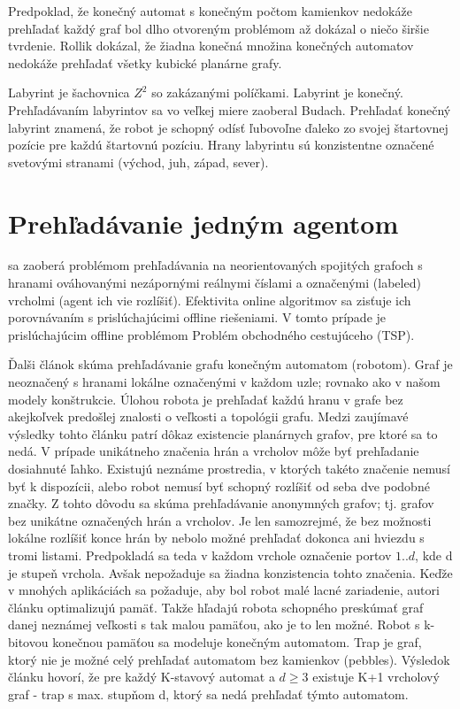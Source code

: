 Predpoklad, že konečný automat s konečným počtom 
kamienkov nedokáže prehľadať každý graf bol dlho otvoreným problémom až
\cite{ROLL} dokázal o niečo širšie tvrdenie. Rollik \cite{ROLL} dokázal, 
že žiadna konečná množina konečných automatov nedokáže prehľadať všetky 
kubické planárne grafy.

Labyrint je šachovnica $Z^2$ so zakázanými políčkami. 
Labyrint je konečný. Prehľadávaním labyrintov sa vo veľkej miere zaoberal 
Budach.
Prehľadať konečný labyrint znamená, že robot je schopný odísť ľubovoľne 
ďaleko zo svojej štartovnej pozície pre každú štartovnú pozíciu. 
Hrany labyrintu sú konzistentne označené svetovými stranami (východ, juh, 
západ, sever).

\section{Prehľadávanie jedným agentom}
\cite{OGE} sa zaoberá problémom prehľadávania na neorientovaných 
spojitých grafoch s hranami ováhovanými nezápornými reálnymi číslami a 
označenými (labeled) vrcholmi (agent ich vie rozlíšiť).
Efektivita online algoritmov sa zisťuje ich porovnávaním s  prislúchajúcimi 
offline riešeniami. V tomto prípade je prislúchajúcim offline problémom
Problém obchodného cestujúceho (TSP).

Ďalši článok \cite{GEFA}
skúma prehľadávanie grafu konečným automatom (robotom). 
Graf je neoznačený s hranami lokálne označenými v každom uzle; rovnako ako v
našom modely konštrukcie.
Úlohou robota je prehľadať každú hranu v grafe bez akejkoľvek predošlej 
znalosti o veľkosti a topológii grafu. Medzi zaujímavé výsledky tohto článku 
patrí dôkaz existencie planárnych grafov, pre ktoré sa to nedá.
V prípade unikátneho značenia hrán a vrcholov môže byť prehľadanie 
dosiahnuté ľahko. Existujú neznáme prostredia, v ktorých takéto značenie 
nemusí byť k dispozícii, alebo robot nemusí byť schopný rozlíšiť od seba dve 
podobné značky. Z tohto dôvodu sa skúma prehľadávanie anonymných grafov; 
tj. grafov bez unikátne označených hrán a vrcholov.
Je len samozrejmé, že bez možnosti lokálne rozlíšiť konce hrán by nebolo možné 
prehľadať dokonca ani hviezdu s tromi listami.
Predpokladá sa teda v každom vrchole označenie portov $1 .. d$, kde d je 
stupeň vrchola. Avšak nepožaduje sa žiadna konzistencia tohto značenia. 
Keďže v mnohých aplikáciách sa požaduje, aby bol robot malé lacné zariadenie, 
autori článku optimalizujú pamäť. Takže hľadajú robota schopného preskúmať 
graf danej neznámej veľkosti s tak malou pamäťou, ako je to len možné. 
Robot s k-bitovou konečnou pamäťou sa modeluje konečným automatom. 
Trap je graf, ktorý nie je možné 
celý prehľadať automatom bez kamienkov (pebbles). Výsledok článku hovorí, 
že pre každý K-stavový automat a $d\geq 3$ existuje K+1 vrcholový graf - trap
s max. stupňom d, ktorý sa nedá prehľadať týmto automatom.

